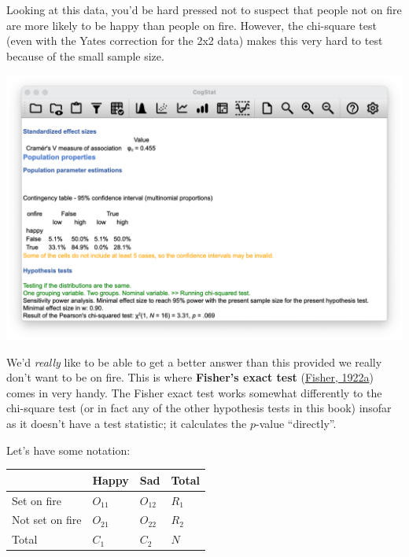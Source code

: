 \documentclass[
]{book}
\theoremstyle{definition}
\theoremstyle{definition}
\theoremstyle{definition}
\theoremstyle{definition}
\theoremstyle{remark}
\begin{document}
Looking at this data, you'd be hard pressed not to suspect that people not on fire are more likely to be happy than people on fire. However, the chi-square test (even with the Yates correction for the 2x2 data) makes this very hard to test because of the small sample size.

\begin{center}\includegraphics[width=0.66\linewidth]{resources/image/cogstatsalemresult} \end{center}

We'd \emph{really} like to be able to get a better answer than this provided we really don't want to be on fire. This is where \textbf{Fisher's exact test} (\protect\hyperlink{ref-Fisher1922}{Fisher, 1922a}) comes in very handy. The Fisher exact test works somewhat differently to the chi-square test (or in fact any of the other hypothesis tests in this book) insofar as it doesn't have a test statistic; it calculates the \(p\)-value ``directly''.

Let's have some notation:

\begin{longtable}[]{@{}llll@{}}
\toprule()
& Happy & Sad & Total \\
\midrule()
\endhead
Set on fire & \(O_{11}\) & \(O_{12}\) & \(R_{1}\) \\
Not set on fire & \(O_{21}\) & \(O_{22}\) & \(R_{2}\) \\
Total & \(C_{1}\) & \(C_{2}\) & \(N\) \\
\bottomrule()
\end{longtable}
\end{document}
